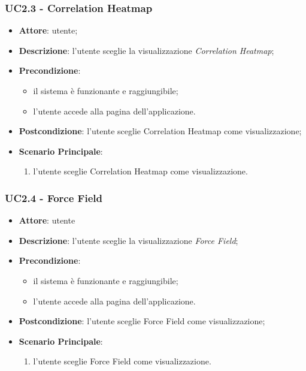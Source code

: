     \subsubsection{UC2.3 - Correlation Heatmap}
    \label{uc2.3}
    
    \begin{itemize}
    \item \textbf{Attore}: utente;
    \item \textbf{Descrizione}: l'utente sceglie la visualizzazione \emph{Correlation Heatmap};
    \item \textbf{Precondizione}:
    \begin{itemize}
        \item il sistema è funzionante e raggiungibile;
        \item l'utente accede alla pagina dell'applicazione.
    \end{itemize}
    \item \textbf{Postcondizione}: l'utente sceglie Correlation Heatmap come visualizzazione;
    \item \textbf{Scenario Principale}: 
        \begin{enumerate}
            \item l'utente sceglie Correlation Heatmap come visualizzazione.
        \end{enumerate}
    \end{itemize}
    
    \subsubsection{UC2.4 - Force Field}
    \label{uc2.4}
    
    \begin{itemize}
    \item \textbf{Attore}: utente
    \item \textbf{Descrizione}: l'utente sceglie la visualizzazione \emph{Force Field};
    \item \textbf{Precondizione}:
    \begin{itemize}
        \item il sistema è funzionante e raggiungibile;
        \item l'utente accede alla pagina dell'applicazione.
    \end{itemize}
    \item \textbf{Postcondizione}: l'utente sceglie Force Field come visualizzazione;
    \item \textbf{Scenario Principale}: 
        \begin{enumerate}
            \item l'utente sceglie Force Field come visualizzazione.
        \end{enumerate}
    \end{itemize}
    
